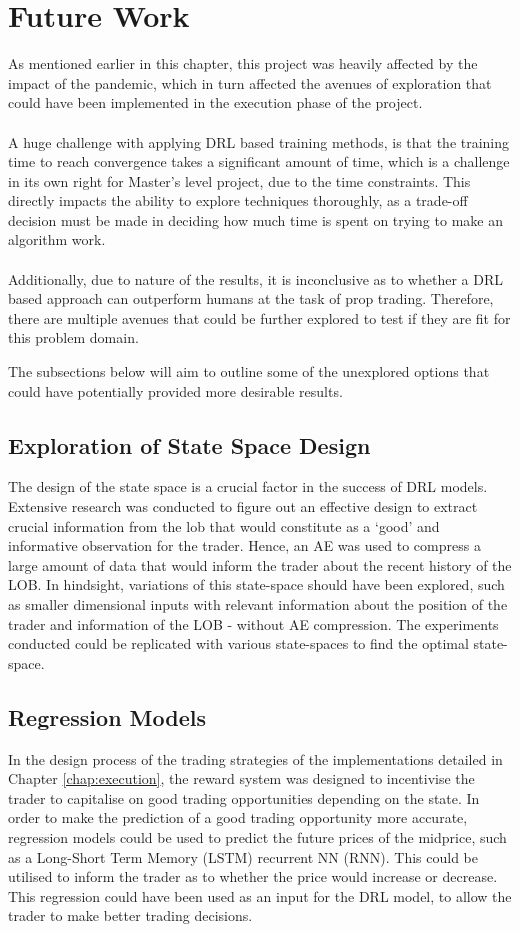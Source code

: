 \documentclass[ %
                    author={Ashwinder Khurana},
                supervisor={Prof Dave Cliff},
                    degree={MEng},
                     title={The Deeply Reinforced Trader},
                  subtitle={},
                      type={enterprise},
                      year={2020} ]{dissertation}
\begin{document}
{\section{Future Work}
As mentioned earlier in this chapter, this project was heavily affected by the impact of the pandemic, which in turn affected the avenues of exploration that could have been implemented in the execution phase of the project.
\\
\\
A huge challenge with applying DRL based training methods, is that the training time to reach convergence takes a significant amount of time, which is a challenge in its own right for Master's level project, due to the time constraints. This directly impacts the ability to explore techniques thoroughly, as a trade-off decision must be made in deciding how much time is spent on trying to make an algorithm work. 
\\
\\
Additionally, due to nature of the results, it is inconclusive as to whether a DRL based approach can outperform humans at the task of prop trading. Therefore, there are multiple avenues that could be further explored to test if they are fit for this problem domain. 

\noindent
The subsections below will aim to outline some of the unexplored options that could have potentially provided more desirable results.  

\subsection{Exploration of State Space Design}
The design of the state space is a crucial factor in the success of DRL models. Extensive research was conducted to figure out an effective design to extract crucial information from the lob that would constitute as a \enquote*{good} and informative observation for the trader. Hence, an AE was used to compress a large amount of data that would inform the trader about the recent history of the LOB. In hindsight, variations of this state-space should have been explored, such as smaller dimensional inputs with relevant information about the position of the trader and information of the LOB - without AE compression. The experiments conducted could be replicated with various state-spaces to find the optimal state-space.
\subsection{Regression Models}
In the design process of the trading strategies of the implementations detailed in Chapter \ref{chap:execution}, the reward system was designed to incentivise the trader to capitalise on good trading opportunities depending on the state. In order to make the prediction of a good trading opportunity more accurate, regression models could be used to predict the future prices of the midprice, such as a Long-Short Term Memory (LSTM) recurrent NN (RNN). This could be utilised to inform the trader as to whether the price would increase or decrease. This regression could have been used as an input for the DRL model, to allow the trader to make better trading decisions. 
}
\end{document}
